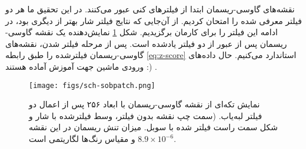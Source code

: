 نقشه‌های گاوسی-ریسمان ابتدا از فیلتر‌های کنی عبور می‌کنند. در این تحقیق ما هر دو فیلتر معرفی شده را امتحان کردیم. از آن‌جایی که نتایج فیلتر شار بهتر از دیگری بود، در ادامه این فیلتر را برای کارمان برگزیدیم. شکل
\ref{fig:sch-sobpatch}
نمایش‌دهنده یک نقشه گاوسی-ریسمان پس از عبور از دو فیلتر یادشده است. پس از مرحله فیلتر شدن، نقشه‌های گاوسی-ریسمان فیلترشده را طبق رابطه
\ref{eq:z-score}  
استاندارد می‌کنیم. حال داده‌های ورودی ماشین جهت آموزش آماده هستند :) .
\begin{figure}
	\begin{center}
		\texttt{[image: figs/sch-sobpatch.png]}
	\end{center}
	\caption[
نمایش تکه‌‌‌ای از نقشه گاوسی-ریسمان با ابعاد ۲۵۶ پس از اعمال دو فیلتر لبه‌یاب. (سمت چپ نقشه بدون فیلتر، وسط فیلترشده با شار و شکل سمت راست فیلتر شده با سوبل. میزان تنش ریسمان در این نقشه
  $8.9\times 10^{-6}$
  و مقیاس رنگ‌ها لگاریتمی است.
	]{نمایش تکه‌‌‌ای از نقشه گاوسی-ریسمان با ابعاد ۲۵۶ پس از اعمال دو فیلتر لبه‌یاب. (سمت چپ نقشه بدون فیلتر، وسط فیلترشده با شار و شکل سمت راست فیلتر شده با سوبل. میزان تنش ریسمان در این نقشه
		$8.9\times 10^{-6}$
		و مقیاس رنگ‌ها لگاریتمی است.}
	\label{fig:sch-sobpatch}
\end{figure} 

